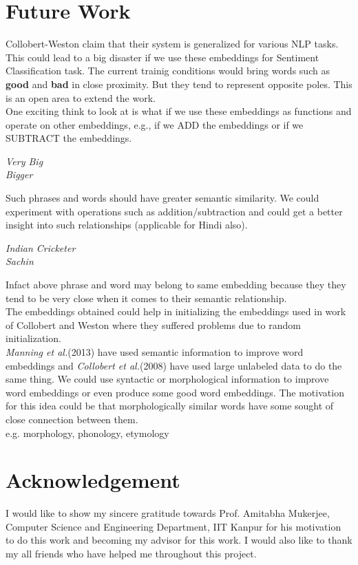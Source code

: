 \documentclass{article}
\begin{document}
\section{Future Work}
Collobert-Weston claim that their system is generalized for various NLP tasks. This could lead to a big disaster if we use these embeddings for Sentiment Classification task. The current trainig conditions would bring words such as \textbf{good} and \textbf{bad} in close proximity. But they tend to represent opposite poles. This is an open area to extend the work.\\
One exciting think to look at is what if we use these embeddings as functions and operate on other embeddings, e.g., if we ADD the embeddings or if we SUBTRACT the embeddings.
\begin{center}
\emph{Very Big}\\
\emph{Bigger}\\
\end{center}
Such phrases and words should have greater semantic similarity. We could experiment with operations such as addition/subtraction and could get a better insight into such relationships (applicable for Hindi also).

\begin{center}
\emph{Indian Cricketer}\\
\emph{Sachin}\\
\end{center}
Infact above phrase and word may belong to same embedding because they they tend to be very close when it comes to their semantic relationship.\\
The embeddings obtained could help in initializing the embeddings used in work of Collobert and Weston where they suffered problems due to random initialization.\\
\emph{Manning et al.}(2013) have used semantic information to improve word embeddings and \emph{Collobert et al.}(2008) have used large unlabeled data to do the same thing. We could use syntactic or morphological information to improve word embeddings or even produce some good word embeddings. The motivation for this idea could be that morphologically similar words have some sought of close connection between them.\\
e.g. morphology, phonology, etymology
\section{Acknowledgement}
I would like to show my sincere gratitude towards Prof. Amitabha Mukerjee, Computer Science and Engineering Department, IIT Kanpur for his motivation to do this work and becoming my advisor for this work. I would also like to thank my all friends who have helped me throughout this project.
\newpage
\nocite{*}


\end{document}
